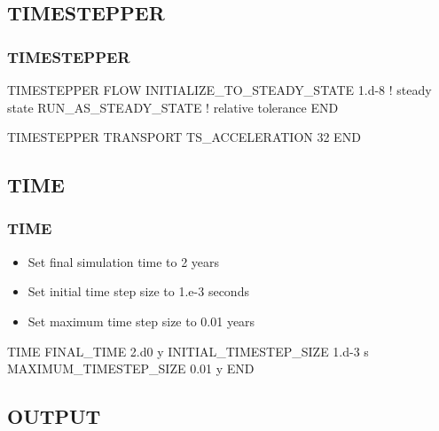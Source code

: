 \documentclass{beamer}
\newcommand\bluecomment[1]{{{\color{blue} #1}}}
\begin{document}
\subsection{TIMESTEPPER}

\begin{frame}[fragile]\frametitle{\bf TIMESTEPPER}

\begin{semiverbatim}
TIMESTEPPER FLOW            
  INITIALIZE_TO_STEADY_STATE 1.d-8 \bluecomment{! steady state}
  RUN_AS_STEADY_STATE              \bluecomment{!   relative tolerance}
END

TIMESTEPPER TRANSPORT
  TS_ACCELERATION 32
END
\end{semiverbatim}

\end{frame}
\subsection{TIME}

\begin{frame}[fragile]\frametitle{\bf TIME}

\begin{itemize}
\item Set final simulation time to 2 years
\item Set initial time step size to 1.e-3 seconds
\item Set maximum time step size to 0.01 years
\end{itemize}

\begin{semiverbatim}

TIME
  FINAL_TIME 2.d0 y
  INITIAL_TIMESTEP_SIZE 1.d-3 s
  MAXIMUM_TIMESTEP_SIZE 0.01 y
END
\end{semiverbatim}

\end{frame}

\subsection{OUTPUT}
\end{document}
